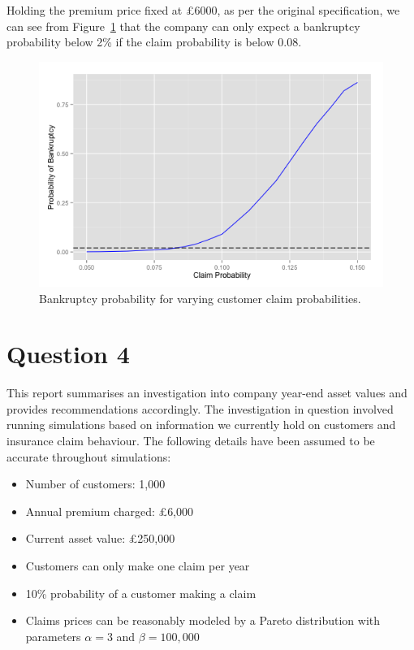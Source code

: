 \documentclass{article}
\begin{document}
Holding the premium price fixed at \pounds{6000}, as per the original
specification, we can see from Figure~\ref{fig:q3_claims} that the
company can only expect a bankruptcy probability below 2\% if the
claim probability is below 0.08.

\begin{figure}
  \includegraphics[width=\textwidth]{q3_claims}
  \caption{Bankruptcy probability for varying customer claim
    probabilities.}
  \centering
\label{fig:q3_claims}
\end{figure}

\section*{Question 4}

This report summarises an investigation into company year-end asset
values and provides recommendations accordingly. The investigation in
question involved running simulations based on information we
currently hold on customers and insurance claim behaviour. The
following details have been assumed to be accurate throughout
simulations:

\begin{itemize}
  \item Number of customers: 1,000
  \item Annual premium charged: \pounds{6,000}
  \item Current asset value: \pounds{250,000}
  \item Customers can only make one claim per year
  \item 10\% probability of a customer making a claim
  \item Claims prices can be reasonably modeled by a Pareto distribution with
    parameters $\alpha = 3$ and $\beta = 100,000$
\end{itemize}
\end{document}
